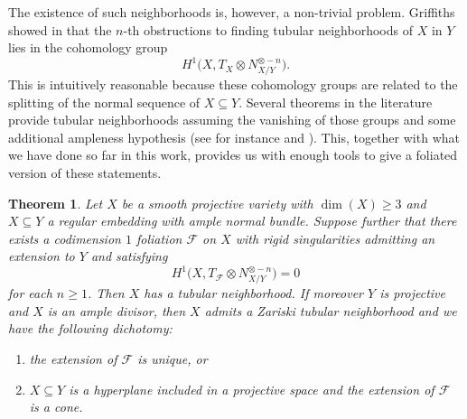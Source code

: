 \documentclass[reqno]{amsart}
\theoremstyle{plain}
\newcommand{\F}{\mathscr{F}}
\newcounter{Theorem}
\newtheorem{theorem}{Theorem}[section]
\theoremstyle{definition}
\theoremstyle{named}
\begin{document}
 The existence of such neighborhoods is, however, a non-trivial problem. Griffiths showed in \cite[Proposition 1.6]{griffiths1966extension} that the $n$-th obstructions to finding tubular neighborhoods of $X$ in $Y$ lies in the cohomology group
\[
H^1\big(X,T_X\otimes N_{X/Y}^{\otimes -n}\big).
\]
This is intuitively reasonable because these cohomology groups are related to the splitting of the normal sequence of $X\subseteq Y$. Several theorems in the literature provide tubular neighborhoods assuming the vanishing of those groups and some additional ampleness hypothesis (see for instance \cite[Corollary p.363]{grauert1962modifikationen} and \cite{fujita1983rational}). This, together with what we have done so far in this work, provides us with enough tools to give a foliated version of these statements.

\begin{theorem} \label{fol_grauert}
    Let $X$ be a smooth projective variety with $\dim(X)\geq 3$ and $X\subseteq Y$ a regular embedding with ample normal bundle. Suppose further that there exists a codimension $1$ foliation $\F$ on $X$ with rigid singularities admitting an extension to $Y$ and satisfying
    $$H^1\big(X,T_\F\otimes N_{X/Y}^{\otimes -n}\big) = 0$$
for each $n\geqslant 1$. Then $X$ has a tubular neighborhood. If moreover $Y$ is projective and $X$ is an ample divisor, then $X$ admits a Zariski tubular neighborhood and we have the following dichotomy:
\begin{enumerate}
    \item the extension of $\F$ is unique, or
    \item $X\subseteq Y$ is a hyperplane included in a projective space and the extension of $\F$ is a cone.
\end{enumerate}
\end{theorem}
\end{document}
